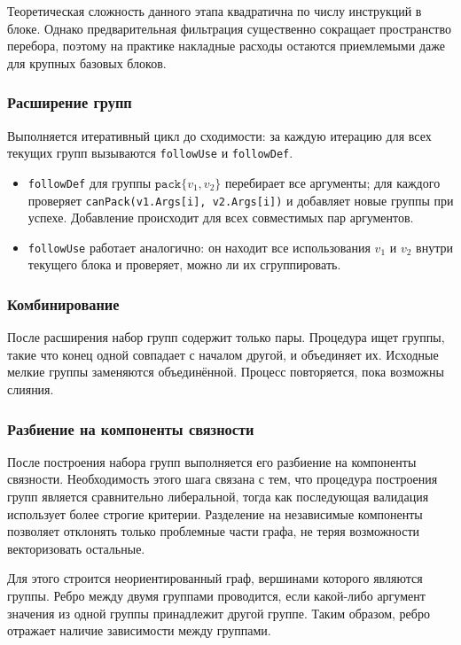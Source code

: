 Теоретическая сложность данного этапа квадратична по числу инструкций в блоке. 
Однако предварительная фильтрация существенно сокращает пространство перебора, поэтому на практике накладные расходы остаются приемлемыми 
даже для крупных базовых блоков.

\subsubsection{Расширение групп}

Выполняется итеративный цикл до сходимости: за каждую итерацию для всех текущих групп вызываются \texttt{followUse} и \texttt{followDef}.

\begin{itemize}
    \item \texttt{followDef} для группы \(\texttt{pack}\{v_1, v_2\}\) перебирает все аргументы; для каждого проверяет \texttt{canPack(v1.Args[i], v2.Args[i])} 
    и добавляет новые группы при успехе. Добавление происходит для всех совместимых пар аргументов.
    \item \texttt{followUse} работает аналогично: он находит все использования \(v_1\) и \(v_2\) внутри текущего блока и проверяет, можно ли их сгруппировать.
\end{itemize}

\subsubsection{Комбинирование}

После расширения набор групп содержит только пары. 
Процедура ищет группы, такие что конец одной совпадает с началом другой, и объединяет их. 
Исходные мелкие группы заменяются объединённой. Процесс повторяется, пока возможны слияния.

\subsubsection{Разбиение на компоненты связности}

После построения набора групп выполняется его разбиение на компоненты связности. Необходимость этого шага связана с тем,
что процедура построения групп является сравнительно либеральной, тогда как последующая валидация использует более строгие критерии.
Разделение на независимые компоненты позволяет отклонять только проблемные части графа, не теряя возможности векторизовать остальные.

Для этого строится неориентированный граф, вершинами которого являются группы.
Ребро между двумя группами проводится, если какой-либо аргумент значения из одной группы принадлежит другой группе.
Таким образом, ребро отражает наличие зависимости между группами.

